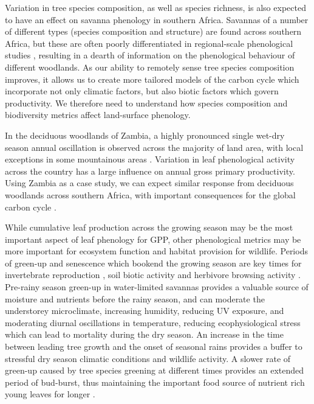 \documentclass[11pt,a4paper]{article}
\begin{document}
Variation in tree species composition, as well as species richness, is also expected to have an effect on savanna phenology in southern Africa. Savannas of a number of different types (species composition and structure) are found across southern Africa, but these are often poorly differentiated in regional-scale phenological studies \citep{}, resulting in a dearth of information on the phenological behaviour of different woodlands. As our ability to remotely sense tree species composition improves, it allows us to create more tailored models of the carbon cycle which incorporate not only climatic factors, but also biotic factors which govern productivity. We therefore need to understand how species composition and biodiversity metrics affect land-surface phenology. 

In the deciduous woodlands of Zambia, a highly pronounced single wet-dry season annual oscillation is observed across the majority of land area, with local exceptions in some mountainous areas \citep{}. Variation in leaf phenological activity across the country has a large influence on annual gross primary productivity. Using Zambia as a case study, we can expect similar response from deciduous woodlands across southern Africa, with important consequences for the global carbon cycle \citep{}. 

While cumulative leaf production across the growing season may be the most important aspect of leaf phenology for GPP, other phenological metrics may be more important for ecosystem function and habitat provision for wildlife. Periods of green-up and senescence which bookend the growing season are key times for invertebrate reproduction \citep{}, soil biotic activity \citep{} and herbivore browsing activity \citep{}. Pre-rainy season green-up in water-limited savannas provides a valuable source of moisture and nutrients before the rainy season, and can moderate the understorey microclimate, increasing humidity, reducing UV exposure, and moderating diurnal oscillations in temperature, reducing ecophysiological stress which can lead to mortality during the dry season. An increase in the time between leading tree growth and the onset of seasonal rains provides a buffer to stressful dry season climatic conditions and wildlife activity. A slower rate of green-up caused by tree species greening at different times provides an extended period of bud-burst, thus maintaining the important food source of nutrient rich young leaves for longer \citep{}.
 
\end{document}
